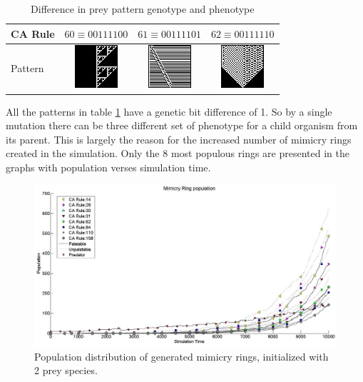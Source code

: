 \begin{table}[H]
\centering
\begin{tabular}{|l|c|c|c|}
  \hline
  CA Rule & \(60 \equiv 00111100\) & \(61 \equiv 00111101\) & \(62 \equiv 00111110 \) \\ \hline
  Pattern & \parbox[c]{2.1em}{\includegraphics[scale=0.50]{images/CARule60}} 
  				& \parbox[c]{2.1em}{\includegraphics[scale=0.50]{images/CARule61}} 
  				& \parbox[c]{2.1em}{\includegraphics[scale=0.50]{images/CARule62}}\\
  \hline
\end{tabular}
\caption{Difference in prey pattern genotype and phenotype}
\label{tab:diff-in-pattern}
\end{table}

All the patterns in table \ref{tab:diff-in-pattern} have a genetic bit difference of 1. So by a single mutation there can be three different set of phenotype for a child organism from its parent. This is largely the reason for the increased number of mimicry rings created in the simulation. Only the 8 most populous rings are presented in the graphs with population verses simulation time.

\begin{figure}[H]
	\centering
	\includegraphics[scale=0.40]{images/simTime10k-2Prey-generated-prey}
	\caption[Population distribution of generated mimicry rings (2 prey species)]{Population distribution of generated mimicry rings, initialized with 2 prey species.}
	\label{fig:plot-2-prey-generated-prey}
\end{figure}


